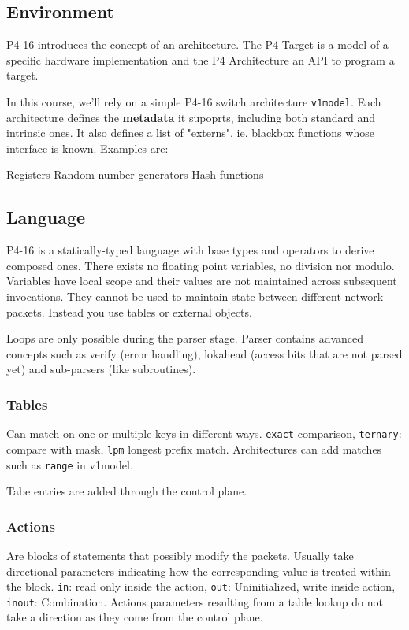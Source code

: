 \documentclass[a4paper, fontsize=8pt, landscape, DIV=1]{scrartcl}
\begin{document}
\begin{multicols*}{4}

  \subsection{Environment}
  P4-16 introduces the concept of an architecture. The P4 Target is a model 
  of a specific hardware implementation and the P4 Architecture an API to
  program a target.


  In this course, we'll rely on a simple P4-16 switch architecture \texttt{v1model}.
  Each architecture defines the \textbf{metadata} it supoprts, including both standard and 
  intrinsic ones. It also defines a list of "externs", ie. blackbox functions whose interface
  is known. Examples are:
  \begin{outline}
   \1 Registers
   \1 Random number generators
   \1 Hash functions
  \end{outline}

  \subsection{Language}
  P4-16 is a statically-typed language with base types and operators to derive composed ones.
  There exists no floating point variables, no division nor modulo. Variables have local scope and
  their values are not maintained across subsequent invocations. They cannot be used to
  maintain state between different network packets. Instead you use tables or external
  objects.

  Loops are only possible during the parser stage. Parser contains advanced concepts such as
  verify (error handling), lokahead (access bits that are not parsed yet) and sub-parsers
  (like subroutines).

  \subsubsection{Tables}
  Can match on one or multiple keys in different ways. \texttt{exact}
  comparison, \texttt{ternary}: compare with mask, \texttt{lpm} longest prefix match.
  Architectures can add matches such as \texttt{range} in v1model.

  Tabe entries are added through the control plane.
  
  \subsubsection{Actions}
  Are blocks of statements that possibly modify the packets. Usually take directional
  parameters indicating how the corresponding value is treated within the block.
  \texttt{in}: read only inside the action, \texttt{out}: Uninitialized, write inside action,
  \texttt{inout}: Combination. Actions parameters resulting from a table lookup do not 
  take a direction as they come from the control plane.


\end{multicols*}
\end{document}
